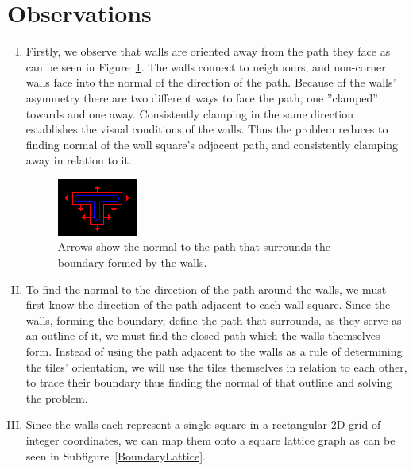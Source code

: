 \section{Observations}
\begin{enumerate}[I.]
\item Firstly, we observe that walls are oriented away from the path they face as can be seen in Figure~\ref{PathNormal}. The walls connect to neighbours, and non-corner walls face into the normal of the direction of the path. Because of the walls' asymmetry there are two different ways to face the path, one ''clamped'' towards and one away. Consistently clamping in the same direction establishes the visual conditions of the walls. Thus the problem reduces to finding normal of the wall square's adjacent path, and consistently clamping away in relation to it.
\begin{figure}[H]
	\centering
	\includegraphics[width=0.4\linewidth]{Image-6.png}
	\caption {Arrows show the normal to the path that surrounds the boundary formed by the walls.\autocite{myself}} \label{PathNormal}
\end{figure}

\item To find the normal to the direction of the path around the walls, we must first know the direction of the path adjacent to each wall square. Since the walls, forming the boundary, define the path that surrounds, as they serve as an outline of it, we must find the closed path which the walls themselves form.\label{ClosedPathObservation} Instead of using the path adjacent to the walls as a rule of determining the tiles' orientation, we will use the tiles themselves in relation to each other, to trace their boundary thus finding the normal of that outline and solving the problem.

\item Since the walls each represent a single square in a rectangular 2D grid of integer coordinates, we can map them onto a square lattice graph as can be seen in Subfigure~\ref{BoundaryLattice}.\label{SquareLatticeObservation}


\end{enumerate}
